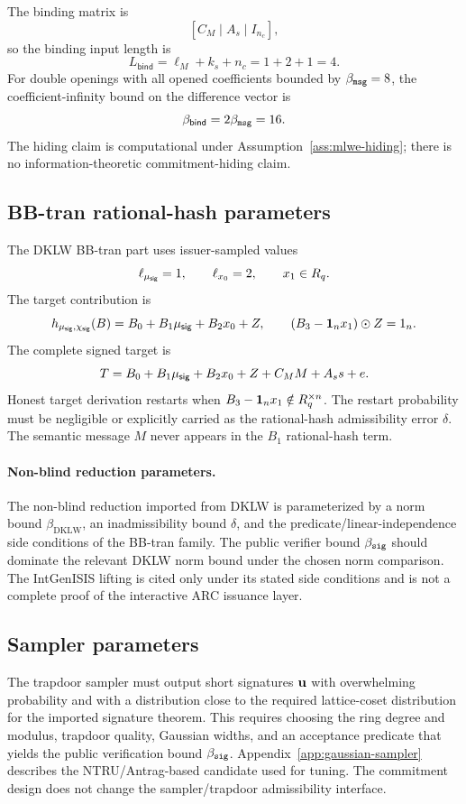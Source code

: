 The binding matrix is
\[
  [C_M\mid A_s\mid I_{n_c}],
\]
so the binding input length is
\[
  L_{\mathsf{bind}}=\ell_M+k_s+n_c=1+2+1=4.
\]
For double openings with all opened coefficients bounded by \(\beta_{\mathtt{msg}}=8\), the coefficient-infinity bound on the
difference vector is
\[
  \beta_{\mathsf{bind}}=2\beta_{\mathtt{msg}}=16.
\]
The hiding claim is computational under Assumption~\ref{ass:mlwe-hiding}; there is no information-theoretic
commitment-hiding claim.

\subsection{BB-tran rational-hash parameters}
The DKLW BB-tran part uses issuer-sampled values
\[
  \ell_{\mu_{\mathsf{sig}}}=1,
  \qquad
  \ell_{x_0}=2,
  \qquad
  x_1\in R_q.
\]
The target contribution is
\[
  h_{\mu_{\mathsf{sig}},\chi_{\mathsf{sig}}}(B)=B_0+B_1\mu_{\mathsf{sig}}+B_2x_0+Z,
  \qquad
  (B_3-\mathbf 1_nx_1)\odot Z=1_n.
\]
The complete signed target is
\[
  T=B_0+B_1\mu_{\mathsf{sig}}+B_2x_0+Z+C_MM+A_s s+e.
\]
Honest target derivation restarts when \(B_3-\mathbf 1_nx_1\notin R_q^{\times n}\).  The restart probability must be
negligible or explicitly carried as the rational-hash admissibility error \(\delta\).  The semantic message \(M\)
never appears in the \(B_1\) rational-hash term.

\paragraph{Non-blind reduction parameters.}
The non-blind reduction imported from DKLW is parameterized by a norm bound \(\beta_{\mathrm{DKLW}}\), an
inadmissibility bound \(\delta\), and the predicate/linear-independence side conditions of the BB-tran family.  The
public verifier bound \(\beta_{\mathtt{sig}}\) should dominate the relevant DKLW norm bound under the chosen norm
comparison.  The IntGenISIS lifting is cited only under its stated side conditions and is not a complete proof of the
interactive ARC issuance layer.

\subsection{Sampler parameters}
The trapdoor sampler must output short signatures \(\mathbf{u}\) with overwhelming probability and with a distribution
close to the required lattice-coset distribution for the imported signature theorem.  This requires choosing the ring
degree and modulus, trapdoor quality, Gaussian widths, and an acceptance predicate that yields the public
verification bound \(\beta_{\mathtt{sig}}\).  Appendix~\ref{app:gaussian-sampler} describes the NTRU/Antrag-based candidate
used for tuning.  The commitment design does not change the sampler/trapdoor admissibility interface.

